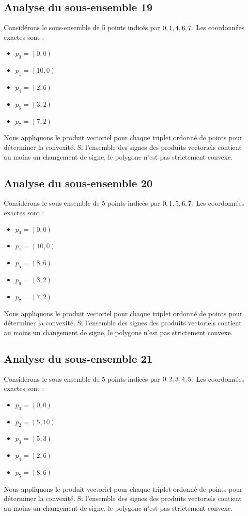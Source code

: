 \documentclass[11pt]{article}
\begin{document}
\subsection{Analyse du sous-ensemble 19}
Considérons le sous-ensemble de 5 points indicés par $\\{ 0, 1, 4, 6, 7 \\}$.
Les coordonnées exactes sont :
\begin{itemize}
\item $p_0 = (0, 0)$
\item $p_1 = (10, 0)$
\item $p_4 = (2, 6)$
\item $p_6 = (3, 2)$
\item $p_7 = (7, 2)$
\end{itemize}
Nous appliquons le produit vectoriel pour chaque triplet ordonné de points pour déterminer la convexité. Si l'ensemble des signes des produits vectoriels contient au moins un changement de signe, le polygone n'est pas strictement convexe.
\newpage

\subsection{Analyse du sous-ensemble 20}
Considérons le sous-ensemble de 5 points indicés par $\\{ 0, 1, 5, 6, 7 \\}$.
Les coordonnées exactes sont :
\begin{itemize}
\item $p_0 = (0, 0)$
\item $p_1 = (10, 0)$
\item $p_5 = (8, 6)$
\item $p_6 = (3, 2)$
\item $p_7 = (7, 2)$
\end{itemize}
Nous appliquons le produit vectoriel pour chaque triplet ordonné de points pour déterminer la convexité. Si l'ensemble des signes des produits vectoriels contient au moins un changement de signe, le polygone n'est pas strictement convexe.
\newpage

\subsection{Analyse du sous-ensemble 21}
Considérons le sous-ensemble de 5 points indicés par $\\{ 0, 2, 3, 4, 5 \\}$.
Les coordonnées exactes sont :
\begin{itemize}
\item $p_0 = (0, 0)$
\item $p_2 = (5, 10)$
\item $p_3 = (5, 3)$
\item $p_4 = (2, 6)$
\item $p_5 = (8, 6)$
\end{itemize}
Nous appliquons le produit vectoriel pour chaque triplet ordonné de points pour déterminer la convexité. Si l'ensemble des signes des produits vectoriels contient au moins un changement de signe, le polygone n'est pas strictement convexe.
\newpage
\end{document}
